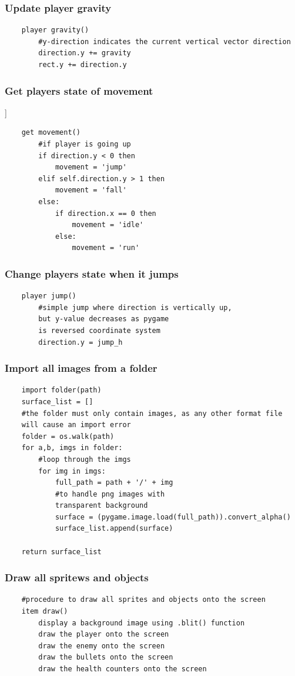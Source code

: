 \documentclass[12pt]{article}
\begin{document}
\subsubsection{Update player gravity}
\begin{verbatim}
    player gravity()
        #y-direction indicates the current vertical vector direction 
        direction.y += gravity
        rect.y += direction.y
\end{verbatim}
\subsubsection{Get players state of movement}]
\begin{verbatim}
    get movement()
        #if player is going up
        if direction.y < 0 then 
            movement = 'jump'
        elif self.direction.y > 1 then 
            movement = 'fall'
        else:
            if direction.x == 0 then
                movement = 'idle'
            else:
                movement = 'run'
\end{verbatim}
\subsubsection{Change players state when it jumps}
\begin{verbatim}
    player jump()
        #simple jump where direction is vertically up, 
        but y-value decreases as pygame 
        is reversed coordinate system
        direction.y = jump_h
\end{verbatim}
\subsubsection{Import all images from a folder}
\begin{verbatim}
    import folder(path)
    surface_list = []
    #the folder must only contain images, as any other format file 
    will cause an import error
    folder = os.walk(path)
    for a,b, imgs in folder:
        #loop through the imgs
        for img in imgs:
            full_path = path + '/' + img 
            #to handle png images with 
            transparent background
            surface = (pygame.image.load(full_path)).convert_alpha() 
            surface_list.append(surface) 

    return surface_list
\end{verbatim}
\subsubsection{Draw all spritews and objects} 
\begin{verbatim}
    #procedure to draw all sprites and objects onto the screen
    item draw() 
        display a background image using .blit() function
        draw the player onto the screen
        draw the enemy onto the screen
        draw the bullets onto the screen
        draw the health counters onto the screen
\end{verbatim}
\end{document}
